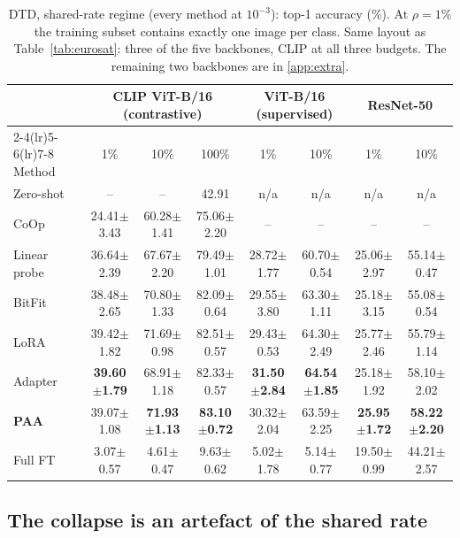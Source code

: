\documentclass[preprint,12pt]{elsarticle}
\newcommand{\ours}{\textsc{PAA}}
\begin{document}
\begin{table}[t]
\centering
\caption{DTD, shared-rate regime (every method at $10^{-3}$): top-1 accuracy
(\%). At $\rho=1\%$ the training subset contains exactly one image per class.
Same layout as Table~\ref{tab:eurosat}: three of the five backbones, CLIP at all
three budgets. The remaining two backbones are in \ref{app:extra}.}
\label{tab:dtd}
\scriptsize
\setlength{\tabcolsep}{3.5pt}
\begin{tabular}{lccccccc}
\toprule
 & \multicolumn{3}{c}{CLIP ViT-B/16 (contrastive)} & \multicolumn{2}{c}{ViT-B/16 (supervised)} & \multicolumn{2}{c}{ResNet-50} \\
\cmidrule(lr){2-4}\cmidrule(lr){5-6}\cmidrule(lr){7-8}
Method & 1\% & 10\% & 100\% & 1\% & 10\% & 1\% & 10\% \\
\midrule
Zero-shot & -- & -- & 42.91 & n/a & n/a & n/a & n/a \\
CoOp & 24.41$\pm$3.43 & 60.28$\pm$1.41 & 75.06$\pm$2.20 & -- & -- & -- & -- \\
Linear probe & 36.64$\pm$2.39 & 67.67$\pm$2.20 & 79.49$\pm$1.01 & 28.72$\pm$1.77 & 60.70$\pm$0.54 & 25.06$\pm$2.97 & 55.14$\pm$0.47 \\
BitFit & 38.48$\pm$2.65 & 70.80$\pm$1.33 & 82.09$\pm$0.64 & 29.55$\pm$3.80 & 63.30$\pm$1.11 & 25.18$\pm$3.15 & 55.08$\pm$0.54 \\
LoRA & 39.42$\pm$1.82 & 71.69$\pm$0.98 & 82.51$\pm$0.57 & 29.43$\pm$0.53 & 64.30$\pm$2.49 & 25.77$\pm$2.46 & 55.79$\pm$1.14 \\
Adapter & \textbf{39.60}$\pm$\textbf{1.79} & 68.91$\pm$1.18 & 82.33$\pm$0.57 & \textbf{31.50}$\pm$\textbf{2.84} & \textbf{64.54}$\pm$\textbf{1.85} & 25.18$\pm$1.92 & 58.10$\pm$2.02 \\
\textbf{\ours} & 39.07$\pm$1.08 & \textbf{71.93}$\pm$\textbf{1.13} & \textbf{83.10}$\pm$\textbf{0.72} & 30.32$\pm$2.04 & 63.59$\pm$2.25 & \textbf{25.95}$\pm$\textbf{1.72} & \textbf{58.22}$\pm$\textbf{2.20} \\
Full FT & 3.07$\pm$0.57 & 4.61$\pm$0.47 & 9.63$\pm$0.62 & 5.02$\pm$1.78 & 5.14$\pm$0.77 & 19.50$\pm$0.99 & 44.21$\pm$2.57 \\
\bottomrule
\end{tabular}
\end{table}

\subsection{The collapse is an artefact of the shared rate}
\label{sec:collapse}
\end{document}
